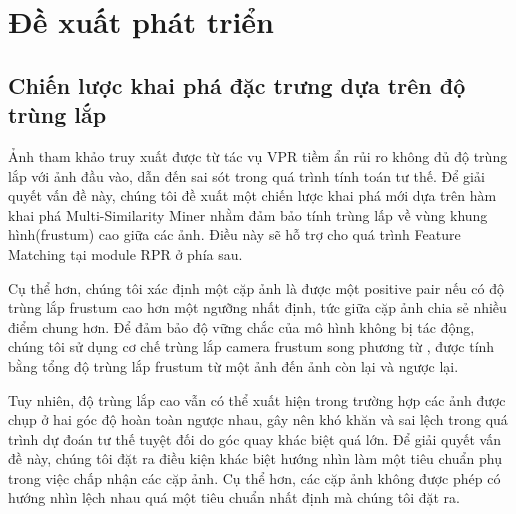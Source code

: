 \section{Đề xuất phát triển}

\subsection{Chiến lược khai phá đặc trưng dựa trên độ trùng lắp}
Ảnh tham khảo truy xuất được từ tác vụ VPR tiềm ẩn rủi ro không đủ độ trùng lắp với ảnh đầu vào, dẫn đến sai sót trong quá trình tính toán tư thế. Để giải quyết vấn đề này, chúng tôi đề xuất một chiến lược khai phá mới dựa trên hàm khai phá Multi-Similarity Miner \cite{wang2019multi} nhằm đảm bảo tính trùng lấp về vùng khung hình(frustum) cao giữa các ảnh. Điều này sẽ hỗ trợ cho quá trình Feature Matching tại module RPR ở phía sau.

Cụ thể hơn, chúng tôi xác định một cặp ảnh là được một positive pair nếu có độ trùng lắp frustum cao hơn một ngưỡng nhất định, tức giữa cặp ảnh chia sẻ nhiều điểm chung hơn. Để đảm bảo độ vững chắc của mô hình không bị tác động, chúng tôi sử dụng cơ chế trùng lắp camera frustum song phương từ \cite{9008579}, được tính bằng tổng độ trùng lắp frustum từ một ảnh đến ảnh còn lại và ngược lại.

Tuy nhiên, độ trùng lắp cao vẫn có thể xuất hiện trong trường hợp các ảnh được chụp ở hai góc độ hoàn toàn ngược nhau, gây nên khó khăn và sai lệch trong quá trình dự đoán tư thế tuyệt đối do góc quay khác biệt quá lớn. Để giải quyết vấn đề này, chúng tôi đặt ra điều kiện khác biệt hướng nhìn làm một tiêu chuẩn phụ trong việc chấp nhận các cặp ảnh. Cụ thể hơn, các cặp ảnh không được phép có hướng nhìn lệch nhau quá một tiêu chuẩn nhất định mà chúng tôi đặt ra.



